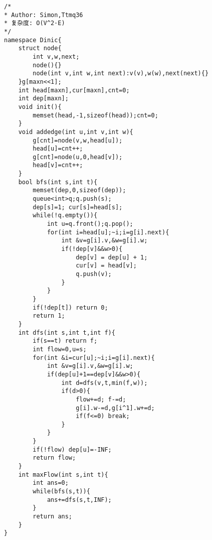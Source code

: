 \begin{lstlisting}
/*
* Author: Simon,Ttmq36
* 复杂度: O(V^2·E)
*/
namespace Dinic{
	struct node{
		int v,w,next;
		node(){}
		node(int v,int w,int next):v(v),w(w),next(next){}
	}g[maxn<<1];
	int head[maxn],cur[maxn],cnt=0;
	int dep[maxn];
	void init(){
		memset(head,-1,sizeof(head));cnt=0;
	}
	void addedge(int u,int v,int w){
		g[cnt]=node(v,w,head[u]);
		head[u]=cnt++;
		g[cnt]=node(u,0,head[v]);
		head[v]=cnt++;
	}
	bool bfs(int s,int t){
		memset(dep,0,sizeof(dep));
		queue<int>q;q.push(s);
		dep[s]=1; cur[s]=head[s];
		while(!q.empty()){
			int u=q.front();q.pop();
			for(int i=head[u];~i;i=g[i].next){
				int &v=g[i].v,&w=g[i].w;
				if(!dep[v]&&w>0){
					dep[v] = dep[u] + 1;
					cur[v] = head[v];
					q.push(v);
				}
			}
		}
		if(!dep[t]) return 0;
		return 1;
	}
	int dfs(int s,int t,int f){
		if(s==t) return f;
		int flow=0,u=s;
		for(int &i=cur[u];~i;i=g[i].next){
			int &v=g[i].v,&w=g[i].w;
			if(dep[u]+1==dep[v]&&w>0){
				int d=dfs(v,t,min(f,w));
				if(d>0){
					flow+=d; f-=d;
					g[i].w-=d,g[i^1].w+=d;
					if(f<=0) break;
				}
			}
		}
		if(!flow) dep[u]=-INF;
		return flow;
	}
	int maxFlow(int s,int t){
		int ans=0;
		while(bfs(s,t)){
			ans+=dfs(s,t,INF);
		}
		return ans;
	}
}
\end{lstlisting}